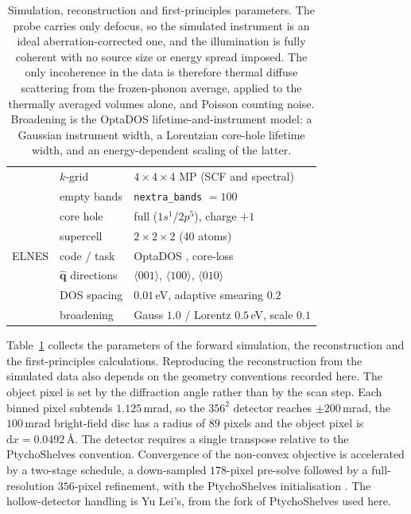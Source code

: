 \documentclass[aps,prb,twocolumn,superscriptaddress,floatfix,nofootinbib]{revtex4-2}
\begin{document}
\begin{table}[t]
\begin{minipage}[t]{0.495\textwidth}
\begin{tabular}{@{}lll@{}}
             & $k$-grid & $4\times4\times4$ MP (SCF and spectral) \\
             & empty bands & \texttt{nextra\_bands} $=100$ \\
             & core hole & full ($1s^1$/$2p^5$), charge $+1$ \\
             & supercell & $2\times2\times2$ (40 atoms) \\
      \addlinespace
      ELNES  & code / task & OptaDOS \citep{Morris2014}, core-loss \\
             & $\hat{\mathbf{q}}$ directions & $\langle001\rangle$, $\langle100\rangle$, $\langle010\rangle$ \\
             & DOS spacing & $0.01$\,eV, adaptive smearing $0.2$ \\
             & broadening & Gauss $1.0$ / Lorentz $0.5$\,eV, scale $0.1$ \\
      \bottomrule
    \end{tabular}
  \end{minipage}
  \caption{Simulation, reconstruction and first-principles parameters. The probe carries only
    defocus, so the simulated instrument is an ideal aberration-corrected one, and the
    illumination is fully coherent with no source size or energy spread imposed. The only incoherence in the data is therefore thermal diffuse scattering from the frozen-phonon average, applied to the thermally averaged volumes alone, and Poisson counting noise. Broadening is the OptaDOS lifetime-and-instrument model: a Gaussian instrument width, a Lorentzian core-hole lifetime width, and an energy-dependent scaling of the latter.}
  \label{tab:params}
\end{table}

Table~\ref{tab:params} collects the parameters of the forward simulation, the reconstruction and the first-principles calculations. Reproducing the reconstruction from the simulated data also depends on the geometry conventions recorded here. The object pixel is set by the diffraction angle rather than by the scan step. Each binned pixel subtends $1.125$\,mrad, so the $356^2$ detector reaches $\pm200$\,mrad, the $100$\,mrad bright-field disc has a radius of $89$ pixels and the object pixel is $\mathrm{d}x=0.0492$\,\AA. The detector requires a single transpose relative to the PtychoShelves convention. Convergence of the non-convex objective is accelerated by a two-stage schedule, a down-sampled $178$-pixel pre-solve followed by a full-resolution $356$-pixel refinement, with the PtychoShelves initialisation \citep{Wakonig2020}. The hollow-detector handling is Yu Lei's, from the fork of PtychoShelves used here.
\end{document}
